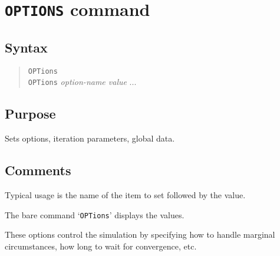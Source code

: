 %
%
%
%
\section{{\tt OPTIONS} command}
\subsection{Syntax}
\begin{verse}
{\tt OPTions}\\
{\tt OPTions} {\it option-name value} ...
\end{verse}
\subsection{Purpose}

Sets options, iteration parameters, global data.
\subsection{Comments}

Typical usage is the name of the item to set followed by the
value.

The bare command `{\tt OPTions}' displays the values.

These options control the simulation by specifying how to
handle marginal circumstances, how long to wait for
convergence, etc.

